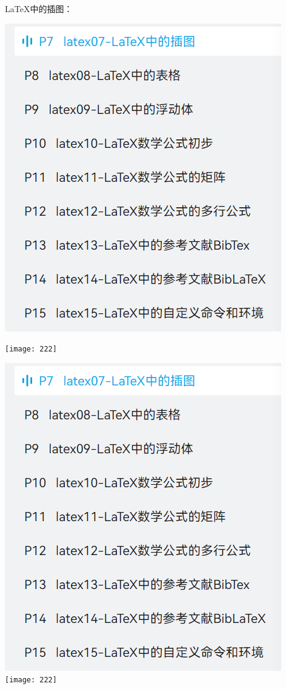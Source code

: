 \documentclass{article}
\begin{document}
    \LaTeX{}中的插图：

    \includegraphics[]{111}

    \texttt{[image: 222]}

    \includegraphics[scale=0.3]{111}
    \texttt{[image: 222]}
\end{document}
